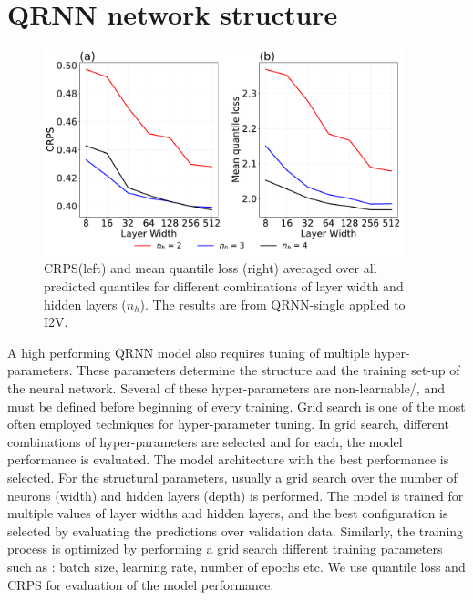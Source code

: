 \documentclass[amt, manuscript]{copernicus}
\begin{document}
\section{QRNN network structure}
\label{appendix:hyperparamter}
%
\begin{figure}[t]
	\centering
	\includegraphics[height=60mm]{Figures/figB1.pdf} 
	\caption{CRPS(left) and mean quantile loss (right) averaged over all predicted quantiles for different combinations of layer width and hidden layers ($n_h$). The results are from QRNN-single applied to I2V.}
	\label{fig:grid_search}	
\end{figure}
A high performing QRNN model also requires tuning of multiple hyper-parameters. These parameters determine the structure and the training set-up of the neural network. Several of these hyper-parameters are non-learnable/, and must be defined before beginning of every training. Grid search is one of the most often employed techniques for hyper-parameter tuning. In grid search, different combinations of hyper-parameters are selected and for each, the model performance is evaluated. The model architecture with the best performance is selected. For the structural parameters, usually a grid search over the number of neurons (width) and hidden layers (depth) is performed. The model is trained for multiple values of layer widths and hidden layers, and the best configuration is selected by evaluating the predictions over validation data. Similarly, the training process is optimized by performing a grid search different training parameters such as : batch size, learning rate, number of epochs etc. We use quantile loss and CRPS for evaluation of the model performance.
\end{document}
